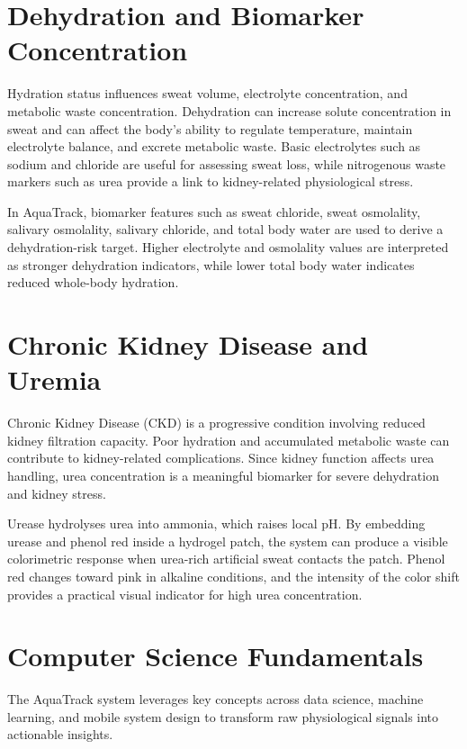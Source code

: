 \section{Dehydration and Biomarker Concentration}

Hydration status influences sweat volume, electrolyte concentration, and metabolic waste concentration. Dehydration can increase solute concentration in sweat and can affect the body's ability to regulate temperature, maintain electrolyte balance, and excrete metabolic waste. Basic electrolytes such as sodium and chloride are useful for assessing sweat loss, while nitrogenous waste markers such as urea provide a link to kidney-related physiological stress.

In AquaTrack, biomarker features such as sweat chloride, sweat osmolality, salivary osmolality, salivary chloride, and total body water are used to derive a dehydration-risk target. Higher electrolyte and osmolality values are interpreted as stronger dehydration indicators, while lower total body water indicates reduced whole-body hydration.

\section{Chronic Kidney Disease and Uremia}

Chronic Kidney Disease (CKD) is a progressive condition involving reduced kidney filtration capacity. Poor hydration and accumulated metabolic waste can contribute to kidney-related complications. Since kidney function affects urea handling, urea concentration is a meaningful biomarker for severe dehydration and kidney stress.

Urease hydrolyses urea into ammonia, which raises local pH. By embedding urease and phenol red inside a hydrogel patch, the system can produce a visible colorimetric response when urea-rich artificial sweat contacts the patch. Phenol red changes toward pink in alkaline conditions, and the intensity of the color shift provides a practical visual indicator for high urea concentration.

\section{Computer Science Fundamentals}

The AquaTrack system leverages key concepts across data science, machine learning, and mobile system design to transform raw physiological signals into actionable insights.

